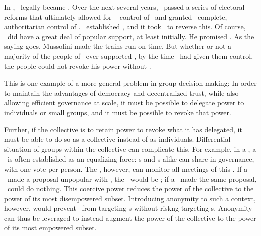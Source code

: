   In \HistContext, \Tyrant~legally became \Office. Over the next several years,
\Congress~passed a series of electoral reforms that ultimately allowed for
\Axis~ control of \Congress~and granted \Tyrant~complete, authoritarian control
of \Domain.  \Tyrant~established \MartialLaw, and it took \War~to reverse this.
Of course, \Tyrant~did have a great deal of popular support, at least initially.
He promised \Platform. As the saying goes, Mussolini made the trains run on
time. But whether or not a majority of the people of \Domain~ever supported
\Axis, by the time \Congress~had given them control, the people could not revoke
his power without \War.

This is one example of a more general problem in group decision-making:
%
In order to maintain the advantages of democracy and decentralized
trust, while also allowing efficient governance at scale, it must be possible to
delegate power to individuals or small groups, and it must be possible to revoke
that power.

Further, if the collective is to retain power to revoke what it has delegated,
it must be able to do so as a collective instead of as individuals. Differential
situation of groups within the collective can complicate this. For example, in
a \GrassContext, a \Org~is often established as an equalizing force:
\Marginalized s and \Dominant s alike can share in governance, with one vote per
person. The \BadGuys, however, can monitor all meetings of this \Org. If a
\Marginalized~made a proposal unpopular with \BadGuys, the \Marginalized~would
be \Disappeared; if a \Dominant~made the same proposal, \BadGuys~could do
nothing. This coercive power reduces the power of the collective to the power of
its most disempowered subset. Introducing anonymity to such a context, however,
would prevent \BadGuys~from targeting \Marginalized s without riskng targeting
\Dominant s. Anonymity can thus be leveraged to instead augment the power of the
collective to the power of its most empowered subset.

